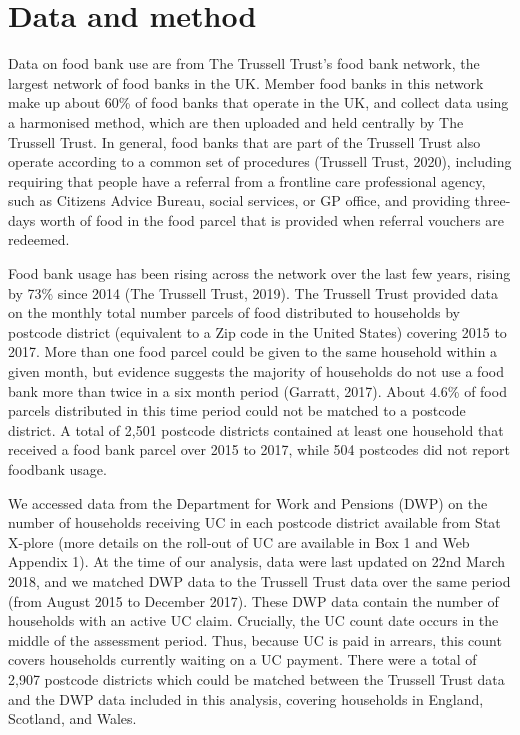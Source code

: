 \documentclass[12pt,article,oneside]{memoir}
\begin{document}
\section*{Data and method}

Data on food bank use are from The Trussell Trust’s food bank network, the largest network of food banks in the UK. Member food banks in this network make up about 60\% of food banks that operate in the UK, and collect data using a harmonised method, which are then uploaded and held centrally by The Trussell Trust. In general, food banks that are part of the Trussell Trust also operate according to a common set of procedures (Trussell Trust, 2020), including requiring that people have a referral from a frontline care professional agency, such as Citizens Advice Bureau, social services, or GP office, and providing three-days worth of food in the food parcel that is provided when referral vouchers are redeemed.

Food bank usage has been rising across the network over the last few years, rising by 73\% since 2014 (The Trussell Trust, 2019). The Trussell Trust provided data on the monthly total number parcels of food distributed to households by postcode district (equivalent to a Zip code in the United States) covering 2015 to 2017. More than one food parcel could be given to the same household within a given month, but evidence suggests the majority of households do not use a food bank more than twice in a six month period (Garratt, 2017). About 4.6\% of food parcels distributed in this time period could not be matched to a postcode district. A total of 2,501 postcode districts contained at least one household that received a food bank parcel over 2015 to 2017, while 504 postcodes did not report foodbank usage. 

We accessed data from the Department for Work and Pensions (DWP) on the number of households receiving UC in each postcode district available from Stat X-plore (more details on the roll-out of UC are available in Box 1 and Web Appendix 1). At the time of our analysis, data were last updated on 22nd March 2018, and we matched DWP data to the Trussell Trust data over the same period (from August 2015 to December 2017). These DWP data contain the number of households with an active UC claim. Crucially, the UC count date occurs in the middle of the assessment period. Thus, because UC is paid in arrears, this count covers households currently waiting on a UC payment. There were a total of 2,907 postcode districts which could be matched between the Trussell Trust data and the DWP data included in this analysis, covering households in England, Scotland, and Wales. 
\end{document}
